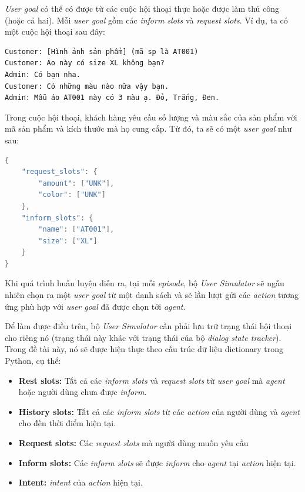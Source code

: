 \textit{User goal} có thể có được từ các cuộc hội thoại thực hoặc được làm thủ công (hoặc cả hai). Mỗi \textit{user goal} gồm các \textit{inform slots} và \textit{request slots}. Ví dụ, ta có một cuộc hội thoại sau đây:

\begin{verbatim}
Customer: [Hình ảnh sản phẩm] (mã sp là AT001)
Customer: Áo này có size XL không bạn?
Admin: Có bạn nha. 
Customer: Có những màu nào nữa vậy bạn.
Admin: Mẫu áo AT001 này có 3 màu ạ. Đỏ, Trắng, Đen.
\end{verbatim}

Trong cuộc hội thoại, khách hàng yêu cầu số lượng và màu sắc của sản phẩm với mã sản phẩm và kích thước mà họ cung cấp. Từ đó, ta sẽ có một \textit{user goal} như sau:

\begin{center}
\begin{lstlisting}[language=Java,breaklines=true]
{
    "request_slots": {
    	"amount": ["UNK"],
    	"color": ["UNK"]
    },
    "inform_slots": {
    	"name": ["AT001"],
    	"size": ["XL"]
    }
}
\end{lstlisting}
\end{center}

Khi quá trình huấn luyện diễn ra, tại mỗi \textit{episode}, bộ \textit{User Simulator} sẽ ngẫu nhiên chọn ra một \textit{user goal} từ một danh sách và sẽ lần lượt gửi các \textit{action} tương ứng phù hợp với \textit{user goal} đã được chọn tới \textit{agent}.

Để làm được điều trên, bộ \textit{User Simulator} cần phải lưu trữ trạng thái hội thoại cho riêng nó (trạng thái này khác với trạng thái của bộ \textit{dialog state tracker}). Trong đề tài này, nó sẽ được hiện thực theo cấu trúc dữ liệu dictionary trong Python, cụ thể:

\begin{itemize}
    \item \textbf{Rest slots:} Tất cả các \textit{inform slots} và \textit{request slots} từ \textit{user goal} mà \textit{agent} hoặc người dùng chưa được \textit{inform}.
    \item \textbf{History slots:} Tất cả các \textit{inform slots} từ các \textit{action} của người dùng và \textit{agent} cho đến thời điểm hiện tại.
    \item \textbf{Request slots:} Các \textit{request slots} mà người dùng muốn yêu cầu
    \item \textbf{Inform slots:} Các \textit{inform slots} sẽ được \textit{inform} cho \textit{agent} tại \textit{action} hiện tại.
    \item \textbf{Intent:} \textit{intent} của \textit{action} hiện tại.
\end{itemize}

